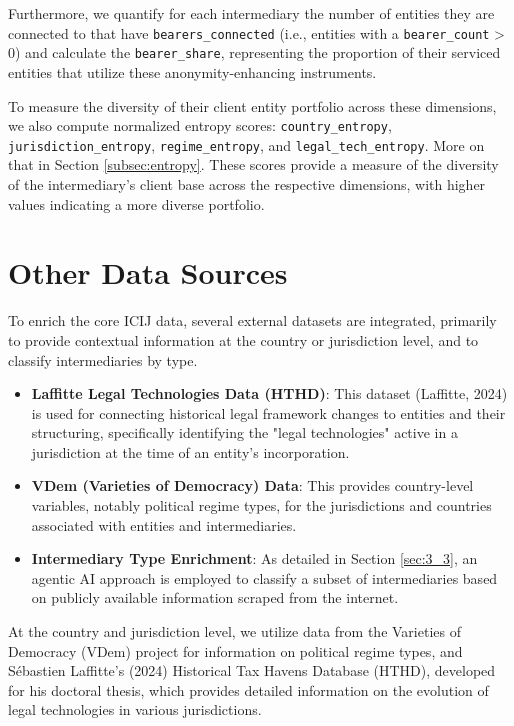 Furthermore, we quantify for each intermediary the number of entities they are connected to that have \texttt{bearers\_connected} (i.e., entities with a \texttt{bearer\_count} > 0) and calculate the \texttt{bearer\_share}, representing the proportion of their serviced entities that utilize these anonymity-enhancing instruments.

To measure the diversity of their client entity portfolio across these dimensions, we also compute normalized entropy scores: \texttt{country\_entropy}, \texttt{jurisdiction\_entropy}, \texttt{regime\_entropy}, and \texttt{legal\_tech\_entropy}. More on that in Section \ref{subsec:entropy}. These scores provide a measure of the diversity of the intermediary's client base across the respective dimensions, with higher values indicating a more diverse portfolio.

\section{Other Data Sources}
\label{sec:3_2}
To enrich the core ICIJ data, several external datasets are integrated, primarily to provide contextual information at the country or jurisdiction level, and to classify intermediaries by type.

\begin{itemize}
    \item \textbf{Laffitte Legal Technologies Data (HTHD)}: This dataset (Laffitte, 2024) is used for connecting historical legal framework changes to entities and their structuring, specifically identifying the "legal technologies" active in a jurisdiction at the time of an entity's incorporation.
    \item \textbf{VDem (Varieties of Democracy) Data}: This provides country-level variables, notably political regime types, for the jurisdictions and countries associated with entities and intermediaries.
    \item \textbf{Intermediary Type Enrichment}: As detailed in Section \ref{sec:3_3}, an agentic AI approach is employed to classify a subset of intermediaries based on publicly available information scraped from the internet.
\end{itemize}

At the country and jurisdiction level, we utilize data from the Varieties of Democracy (VDem) project for information on political regime types, and Sébastien Laffitte's (2024) Historical Tax Havens Database (HTHD), developed for his doctoral thesis, which provides detailed information on the evolution of legal technologies in various jurisdictions.

